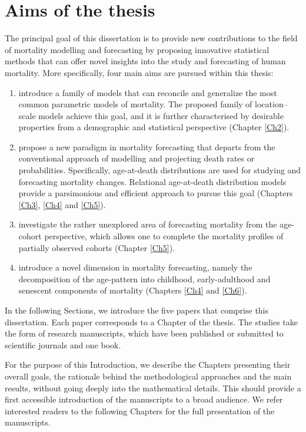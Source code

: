 \documentclass[Thesis]{subfiles}
\begin{document}
\section{Aims of the thesis}\label{Sec:Ch1sec4}
The principal goal of this dissertation is to provide new contributions to the field of mortality modelling and forecasting by proposing innovative statistical methods that can offer novel insights into the study and forecasting of human mortality. More specifically, four main aims are pursued within this thesis:
\medskip
\begin{enumerate}[label={\bfseries Aim \arabic*:},leftmargin=*]
\item introduce a family of models that can reconcile and generalize the most common parametric models of mortality. The proposed family of location--scale models achieve this goal, and it is further characterised by desirable properties from a demographic and statistical perspective (Chapter \ref{Ch2}).
\item propose a new paradigm in mortality forecasting that departs from the conventional approach of modelling and projecting death rates or probabilities. Specifically, age-at-death distributions are used for studying and forecasting mortality changes. Relational age-at-death distribution models provide a parsimonious and efficient approach to pursue this goal (Chapters \ref{Ch3}, \ref{Ch4} and \ref{Ch5}).
\item investigate the rather unexplored area of forecasting mortality from the age-cohort perspective, which allows one to complete the mortality profiles of partially observed cohorts (Chapter \ref{Ch5}).
\item introduce a novel dimension in mortality forecasting, namely the decomposition of the age-pattern into childhood, early-adulthood and senescent components of mortality (Chapters \ref{Ch4} and \ref{Ch6}). 
\end{enumerate}
\medskip
In the following Sections, we introduce the five papers that comprise this dissertation. Each paper corresponds to a Chapter of the thesis. The studies take the form of research manuscripts, which have been published or submitted to scientific journals and one book. 

For the purpose of this Introduction, we describe the Chapters presenting their overall goals, the rationale behind the methodological approaches and the main results, without going deeply into the mathematical details. This should provide a first accessible introduction of the manuscripts to a broad audience. We refer interested readers to the following Chapters for the full presentation of the manuscripts.
\end{document}
